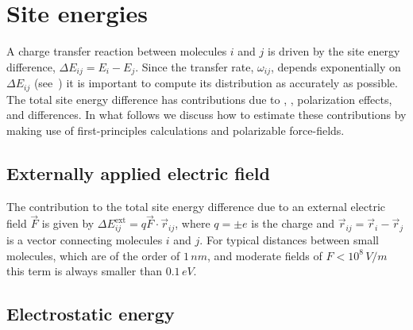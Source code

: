 \section{Site energies}
\label{sec:site_energies}
A charge transfer reaction between molecules $i$ and $j$ is driven by the site energy difference, $\Delta E_{ij} = E_i - E_j$. Since the  transfer rate, $\omega_{ij}$, depends exponentially on $\Delta E_{ij}$ (see~) it is important to compute its distribution as accurately as possible.  The total site energy difference has contributions due to , , polarization effects, and  differences. In what follows we discuss how to estimate these contributions by making use of first-principles calculations and polarizable force-fields.

\subsection{Externally applied electric field}
\label{sec:ext_field}
The contribution to the total site energy difference due to an external electric field $\vec{F}$ is given by $\Delta E_{ij}^\text{ext} = q {\vec{F} \cdot \vec{r}_{ij}}$, where $q=\pm e$ is the charge and $\vec{r}_{ij} = \vec{r}_i  - \vec{r}_j $ is a vector connecting molecules $i$ and $j$. For typical distances between small molecules, which are of the order  of $1\,\unit{nm}$, and moderate fields of $F<10^8\,\unit{V/m}$ this term is always smaller than $0.1\, \unit{eV}$.

\subsection{Electrostatic energy}
\label{sec:electrostatic}

